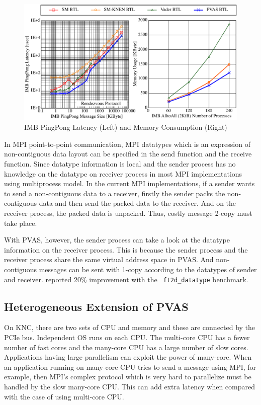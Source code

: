 \begin{figure}[ht]
\begin{center}
\includegraphics[width=0.95\columnwidth]{Figs/PVAS-BTL.pdf}
  \caption{IMB PingPong Latency (Left) and Memory Consumption (Right)}
  \label{fig:pvas-btl}
\end{center}
\end{figure}

In MPI point-to-point communication, MPI datatypes which is an
expression of non-contiguous data layout can be specified in
the send function and the receive function. Since datatype information
is local and the sender process has no knowledge on the datatype on receiver
process in most MPI implementations using multiprocess model. In the
current MPI implementations, if a sender 
wants to send a non-contiguous data to a receiver, firstly the sender
packs the non-contiguous data and then send the packed data to the
receiver. And on the receiver process, the packed data is
unpacked. Thus, costly message 2-copy must take place.

With PVAS, however, the sender process can take a look at the datatype
information on the receiver process. This is because the sender 
process and the receiver process share the same virtual address space in
PVAS. And non-contiguous messages can be sent with
1-copy according to the datatypes of sender and
receiver. \cite{shimada-thesis} reported 20\% improvement with the {\tt 
ft2d\_datatype} benchmark\cite{mpi-ddt-benchmark}.  

\subsection{Heterogeneous Extension of PVAS}\label{sec:mpvas}

On KNC, there are two sets of CPU and memory and these are connected
by the PCIe bus. Independent OS runs on each CPU. The multi-core CPU
has a fewer number of fast cores and the many-core CPU has a large
number of slow cores. Applications having large parallelism can
exploit the power of many-core. When an application running on
many-core CPU tries to send a message using MPI, for example, then MPI's
complex protocol which is very hard to parallelize must be
handled by the slow many-core CPU. This can add extra latency when
compared with the case of using multi-core CPU.

